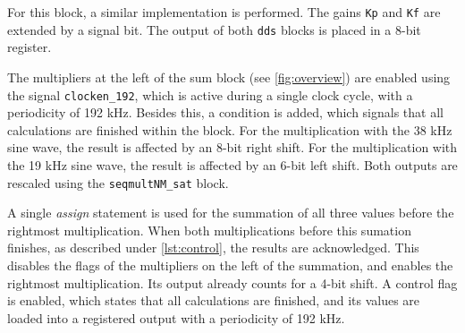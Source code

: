 For this block, a similar implementation is performed. The gains \texttt{Kp} and \texttt{Kf} are extended by a signal bit. The output of both \texttt{dds} blocks is placed in a 8-bit register. 

The multipliers at the left of the sum block (see \autoref{fig:overview}) are enabled using the signal \texttt{clocken\_192}, which is active during a single clock cycle, with a periodicity of 192 kHz. Besides this, a condition is added, which signals that all calculations are finished within the block. For the multiplication with the 38 kHz sine wave, the result is affected by an 8-bit right shift. For the multiplication with the 19 kHz sine wave, the result is affected by an 6-bit left shift. Both outputs are rescaled using the \texttt{seqmultNM\_sat} block.

A single \emph{assign} statement is used for the summation of all three values before the rightmost multiplication. When both multiplications before this sumation finishes, as described under \autoref{lst:control}, the results are acknowledged. This disables the flags of the multipliers on the left of the summation, and enables the rightmost multiplication. Its output already counts for a 4-bit shift. A control flag is enabled, which states that all calculations are finished, and its values are loaded into a registered output with a periodicity of 192 kHz.
